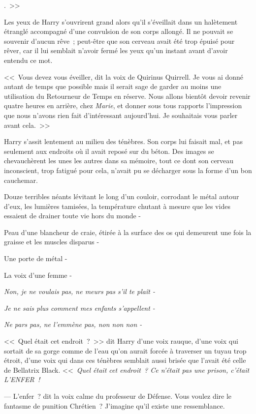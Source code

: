 
.~>>

\hplettrineextrapara
Les yeux de Harry s'ouvrirent grand alors qu'il s'éveillait dans un halètement étranglé accompagné d'une convulsion de son corps allongé. Il ne pouvait se souvenir d'aucun rêve~; peut-être que son cerveau avait été trop épuisé pour rêver, car il lui semblait n'avoir fermé les yeux qu'un instant avant d'avoir entendu ce mot.

<<~Vous devez vous éveiller, dit la voix de Quirinus Quirrell. Je vous ai donné autant de temps que possible mais il serait sage de garder au moins une utilisation du Retourneur de Temps en réserve. Nous allons bientôt devoir revenir quatre heures en arrière, chez \emph{Marie}, et donner sous tous rapports l'impression que nous n'avons rien fait d'intéressant aujourd'hui. Je souhaitais vous parler avant cela.~>>

Harry s'assit lentement au milieu des ténèbres. Son corps lui faisait mal, et pas seulement aux endroits où il avait reposé sur du béton. Des images se chevauchèrent les unes les autres dans sa mémoire, tout ce dont son cerveau inconscient, trop fatigué pour cela, n'avait pu se décharger sous la forme d'un bon cauchemar.

Douze terribles néants lévitant le long d'un couloir, corrodant le métal autour d'eux, les lumières tamisées, la température chutant à mesure que les vides essaient de drainer toute vie hors du monde -

Peau d'une blancheur de craie, étirée à la surface des os qui demeurent une fois la graisse et les muscles disparus -

Une porte de métal -

La voix d'une femme -

\emph{Non, je ne voulais pas, ne meurs pas s'il te plaît -}

\emph{Je ne sais plus comment mes enfants s'appellent -}

\emph{Ne pars pas, ne l'emmène pas, non non non -}

<<~Quel était cet endroit~?~>> dit Harry d'une voix rauque, d'une voix qui sortait de sa gorge comme de l'eau qu'on aurait forcée à traverser un tuyau trop étroit, d'une voix qui dans ces ténèbres semblait aussi brisée que l'avait été celle de Bellatrix Black. <<~\emph{Quel était cet endroit~? Ce n'était pas une prison, c'était L'ENFER~!}

--- L'enfer~? dit la voix calme du professeur de Défense. Vous voulez dire le fantasme de punition Chrétien~? J'imagine qu'il existe une ressemblance.

